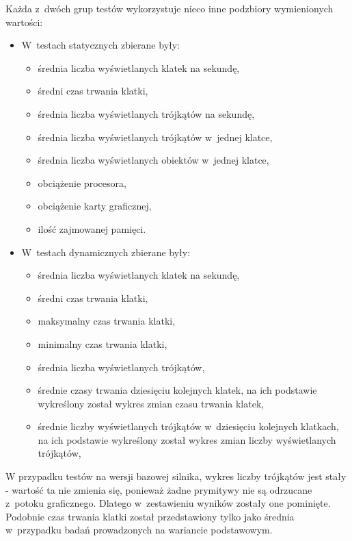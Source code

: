 \documentclass[a4paper,twoside,12pt]{book}
\begin{document}
Każda z~dwóch grup testów wykorzystuje nieco inne podzbiory wymienionych wartości:
\begin{itemize}
    \item W~testach statycznych zbierane były:
    \begin{itemize}
        \item średnia liczba wyświetlanych klatek na sekundę,
        \item średni czas trwania klatki,
        \item średnia liczba wyświetlanych trójkątów na sekundę,
        \item średnia liczba wyświetlanych trójkątów w~jednej klatce,
        \item średnia liczba wyświetlanych obiektów w~jednej klatce,
        \item obciążenie procesora,
        \item obciążenie karty graficznej,
        \item ilość zajmowanej pamięci.
    \end{itemize}
    \item W~testach dynamicznych zbierane były:
    \begin{itemize}
        \item średnia liczba wyświetlanych klatek na sekundę,
        \item średni czas trwania klatki,
        \item maksymalny czas trwania klatki,
        \item minimalny czas trwania klatki,
        \item średnia liczba wyświetlanych trójkątów,
        \item średnie czasy trwania dziesięciu kolejnych klatek, na ich podstawie wykreślony został wykres zmian czasu trwania klatek,
        \item średnie liczby wyświetlanych trójkątów w~dziesięciu kolejnych klatkach, na ich podstawie wykreślony został wykres zmian liczby wyświetlanych trójkątów,
    \end{itemize}
\end{itemize}

\vbox{}

W przypadku testów na wersji bazowej silnika, wykres liczby trójkątów jest stały - wartość ta nie zmienia się, ponieważ żadne prymitywy nie są odrzucane z~potoku graficznego. Dlatego w~zestawieniu wyników zostały one pominięte. Podobnie czas trwania klatki został przedstawiony tylko jako średnia w~przypadku badań prowadzonych na wariancie podstawowym.
\end{document}
